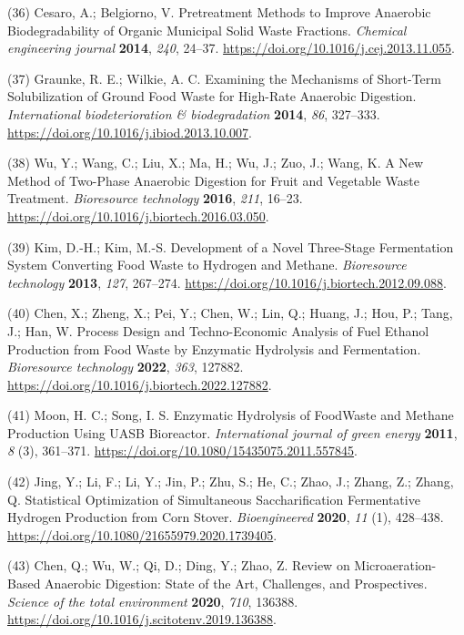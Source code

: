 \documentclass[11pt]{report}
\begin{document}
\hypertarget{citeproc_bib_item_36}{(36) Cesaro, A.; Belgiorno, V. Pretreatment Methods to Improve Anaerobic Biodegradability of Organic Municipal Solid Waste Fractions. \textit{Chemical engineering journal} \textbf{2014}, \textit{240}, 24–37. \url{https://doi.org/10.1016/j.cej.2013.11.055}.}

\hypertarget{citeproc_bib_item_37}{(37) Graunke, R. E.; Wilkie, A. C. Examining the Mechanisms of Short-Term Solubilization of Ground Food Waste for High-Rate Anaerobic Digestion. \textit{International biodeterioration \& biodegradation} \textbf{2014}, \textit{86}, 327–333. \url{https://doi.org/10.1016/j.ibiod.2013.10.007}.}

\hypertarget{citeproc_bib_item_38}{(38) Wu, Y.; Wang, C.; Liu, X.; Ma, H.; Wu, J.; Zuo, J.; Wang, K. A New Method of Two-Phase Anaerobic Digestion for Fruit and Vegetable Waste Treatment. \textit{Bioresource technology} \textbf{2016}, \textit{211}, 16–23. \url{https://doi.org/10.1016/j.biortech.2016.03.050}.}

\hypertarget{citeproc_bib_item_39}{(39) Kim, D.-H.; Kim, M.-S. Development of a Novel Three-Stage Fermentation System Converting Food Waste to Hydrogen and Methane. \textit{Bioresource technology} \textbf{2013}, \textit{127}, 267–274. \url{https://doi.org/10.1016/j.biortech.2012.09.088}.}

\hypertarget{citeproc_bib_item_40}{(40) Chen, X.; Zheng, X.; Pei, Y.; Chen, W.; Lin, Q.; Huang, J.; Hou, P.; Tang, J.; Han, W. Process Design and Techno-Economic Analysis of Fuel Ethanol Production from Food Waste by Enzymatic Hydrolysis and Fermentation. \textit{Bioresource technology} \textbf{2022}, \textit{363}, 127882. \url{https://doi.org/10.1016/j.biortech.2022.127882}.}

\hypertarget{citeproc_bib_item_41}{(41) Moon, H. C.; Song, I. S. Enzymatic Hydrolysis of FoodWaste and Methane Production Using UASB Bioreactor. \textit{International journal of green energy} \textbf{2011}, \textit{8} (3), 361–371. \url{https://doi.org/10.1080/15435075.2011.557845}.}

\hypertarget{citeproc_bib_item_42}{(42) Jing, Y.; Li, F.; Li, Y.; Jin, P.; Zhu, S.; He, C.; Zhao, J.; Zhang, Z.; Zhang, Q. Statistical Optimization of Simultaneous Saccharification Fermentative Hydrogen Production from Corn Stover. \textit{Bioengineered} \textbf{2020}, \textit{11} (1), 428–438. \url{https://doi.org/10.1080/21655979.2020.1739405}.}

\hypertarget{citeproc_bib_item_43}{(43) Chen, Q.; Wu, W.; Qi, D.; Ding, Y.; Zhao, Z. Review on Microaeration-Based Anaerobic Digestion: State of the Art, Challenges, and Prospectives. \textit{Science of the total environment} \textbf{2020}, \textit{710}, 136388. \url{https://doi.org/10.1016/j.scitotenv.2019.136388}.}
\end{document}
